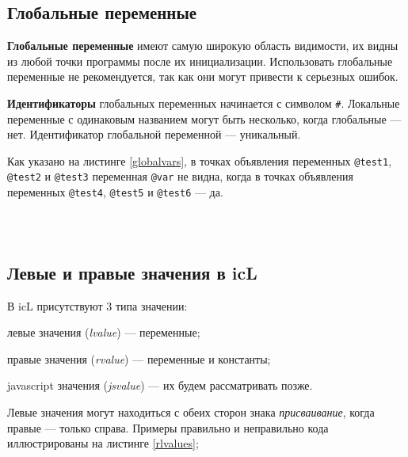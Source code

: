 \subsection{Глобальные переменные}

\textbf{Глобальные переменные} имеют самую широкую область видимости, их видны из любой точки программы после их инициализации. Использовать глобальные переменные не рекомендуется, так как они могут привести к серьезных ошибок.

{\bf Идентификаторы} глобальных переменных начинается с символом {\color{blue2}\texttt{#}}. Локальные переменные с одинаковым названием могут быть несколько, когда глобальные — нет. Идентификатор глобальной переменной — уникальный.

Как указано на листинге \ref{globalvars}, в точках объявления переменных \texttt{@test1}, \texttt{@test2} и \texttt{@test3} переменная \texttt{@var} не видна, когда в точках объявления переменных \texttt{@test4}, \texttt{@test5} и \texttt{@test6} — да.

\

\begin{sourcecode}
	\label{globalvars}
	\inputminted[linenos]{icl}{../sources/globalvars.icL}
\end{sourcecode}

\subsection{Левые и правые значения в icL}

В icL присутствуют 3 типа значении:

\begin{icEnum}
\item
	левые значения ({\it lvalue}) — переменные;
\item
	правые значения ({\it rvalue}) — переменные и константы;
\item
	javascript значения ({\it jsvalue}) — их будем рассматривать позже.
\end{icEnum}

Левые значения могут находиться с обеих сторон знака {\it присваивание}, когда правые — только справа. Примеры правильно и неправильно кода иллюстрированы на листинге \ref{rlvalues};

\begin{sourcecode}
	\label{rlvalues}
	\inputminted[linenos]{icl}{../sources/rlvalues.icL}
\end{sourcecode}

